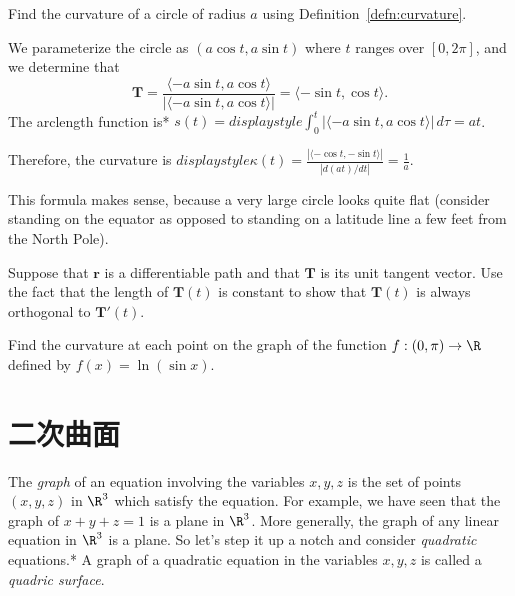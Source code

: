 \documentclass[indent]{watsonbook}
\begin{document}
{\begin{example}{}{}
  Find the curvature of a circle of radius $a$ using
  Definition~\ref{defn:curvature}.
\end{example}

\begin{solution}
  We parameterize the circle as $(a \cos t, a \sin t)$ where $t$
  ranges over $[0,2\pi]$, and we determine that
  \[
    \mathbf{T} = \frac{\langle -a \sin t, a \cos t\rangle }{|\langle
      -a \sin t, a \cos t\rangle|} = \langle -\sin t, \cos t \rangle.
  \]
  The arclength function is* $s(t) = {d}isplaystyle{\int_0^t |\langle -a \sin t, a \cos
    t\rangle| \, {d}\tau} = at$. 

  Therefore, the curvature is ${d}isplaystyle{\kappa(t) = \frac{|\langle -\cos t, -\sin t
      \rangle|}{|{d}(at)/{d} t|} = \boxed{\frac{1}{a}}}$.

  This formula makes sense, because a very large circle looks quite flat
  (consider standing on the equator as opposed to standing on a
  latitude line a few feet from the North Pole).
\end{solution}

\begin{exercise}{}{}
  Suppose that $\mathbf{r}$ is a differentiable path and that
  $\mathbf{T}$ is its unit tangent vector. Use the fact that the
  length of $\mathbf{T}(t)$ is constant to show that $\mathbf{T}(t)$ is
  always orthogonal to $\mathbf{T}'(t)$.
\end{exercise}

\begin{exercise}{}{}
  Find the curvature at each point on the graph of the function
  $f:(0,\pi) \to \R$ defined by  $f(x) = \ln (\sin x)$.
\end{exercise}

\section{二次曲面} \label{sec:quadric_surfaces}

The \textit{graph} of an equation involving the variables $x,y,z$ is
the set of points $(x,y,z)$ in $\R^3$ which satisfy the equation. For
example, we have seen that the graph of $x + y + z = 1$ is a plane in
$\R^3$. More generally, the graph of any linear equation in $\R^3$ is
a plane. So let's step it up a notch and consider \textit{quadratic}
equations.*  A graph of a quadratic
equation in the variables $x,y,z$ is called a \textit{quadric
  surface}.

}
\end{document}
